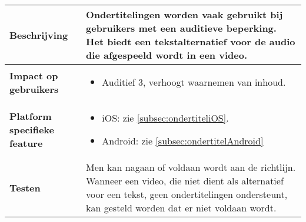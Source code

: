 \begin{table}[H]
\begin{tabular}{|l|p{12cm}|}
        \hline
        \textbf{Beschrijving}                & Ondertitelingen worden vaak gebruikt bij gebruikers met een auditieve beperking. Het biedt een tekstalternatief voor de audio die afgespeeld wordt in een video. \\ 
        \hline
        \textbf{Impact op gebruikers}        & 
        \begin{itemize}
            \item Auditief 3, verhoogt waarnemen van inhoud.             
        \end{itemize}                                                                                                                   \\ 
      \hline
    \textbf{Platform specifieke feature} & \begin{itemize}
        \item iOS: zie \ref{subsec:ondertiteliOS}.
        \item Android: zie \ref{subsec:ondertitelAndroid}
    \end{itemize}                                                                                                                                                                       \\ 
        \hline
        \textbf{Testen}                      & Men kan nagaan of voldaan wordt aan de richtlijn. Wanneer een video, die niet dient als alternatief voor een tekst, geen ondertitelingen ondersteunt, kan gesteld worden dat er niet voldaan wordt.                                                                                                                                                                                              \\
        \hline
    \end{tabular}
\end{table}


